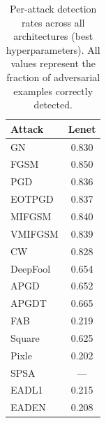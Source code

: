 \begin{table}[t]
\centering
\caption{Per-attack detection rates across all architectures (best hyperparameters). All values represent the fraction of adversarial examples correctly detected.}
\label{tab:full_attacks}
\begin{tabular}{l|c}
\toprule
Attack & Lenet \\
\midrule
GN & 0.830 \\
FGSM & 0.850 \\
PGD & 0.836 \\
EOTPGD & 0.837 \\
MIFGSM & 0.840 \\
VMIFGSM & 0.839 \\
CW & 0.828 \\
DeepFool & 0.654 \\
APGD & 0.652 \\
APGDT & 0.665 \\
FAB & 0.219 \\
Square & 0.625 \\
Pixle & 0.202 \\
SPSA & --- \\
EADL1 & 0.215 \\
EADEN & 0.208 \\
\bottomrule
\end{tabular}
\end{table}